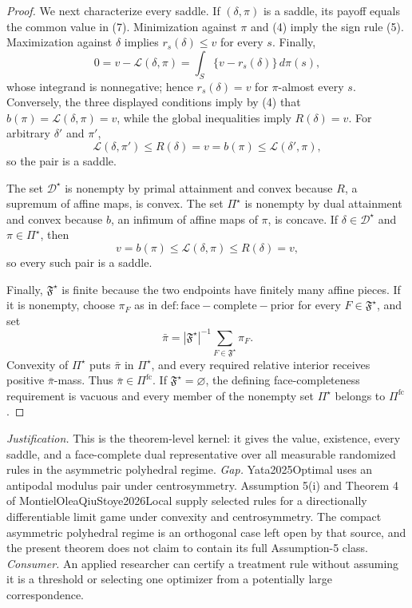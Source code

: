 \documentclass{article}
\begin{document}
\begin{proof}
We next characterize every saddle. If \((\delta,\pi)\) is a saddle, its payoff equals the common value in (7). Minimization against \(\pi\) and (4) imply the sign rule (5). Maximization against \(\delta\) implies \(r_s(\delta)\leq v\) for every \(s\). Finally,
\[
 0=v-\mathcal L(\delta,\pi)=\int_S\{v-r_s(\delta)\}\,d\pi(s),
\]
whose integrand is nonnegative; hence \(r_s(\delta)=v\) for \(\pi\)-almost every \(s\). Conversely, the three displayed conditions imply by (4) that \(b(\pi)=\mathcal L(\delta,\pi)=v\), while the global inequalities imply \(R(\delta)=v\). For arbitrary \(\delta'\) and \(\pi'\),
\[
 \mathcal L(\delta,\pi')\leq R(\delta)=v
 =b(\pi)\leq\mathcal L(\delta',\pi),
\]
so the pair is a saddle.

The set \(\mathcal D^{\star}\) is nonempty by primal attainment and convex because \(R\), a supremum of affine maps, is convex. The set \(\Pi^{\star}\) is nonempty by dual attainment and convex because \(b\), an infimum of affine maps of \(\pi\), is concave. If \(\delta\in\mathcal D^{\star}\) and \(\pi\in\Pi^{\star}\), then
\[
 v=b(\pi)\leq\mathcal L(\delta,\pi)\leq R(\delta)=v,
\]
so every such pair is a saddle.

Finally, \(\mathfrak F^{\star}\) is finite because the two endpoints have finitely many affine pieces. If it is nonempty, choose \(\pi_F\) as in \(\mathrm{def:face-complete-prior}\) for every \(F\in\mathfrak F^{\star}\), and set
\[
 \bar\pi=|\mathfrak F^{\star}|^{-1}\sum_{F\in\mathfrak F^{\star}}\pi_F.
\]
Convexity of \(\Pi^{\star}\) puts \(\bar\pi\) in \(\Pi^{\star}\), and every required relative interior receives positive \(\bar\pi\)-mass. Thus \(\bar\pi\in\Pi^{\mathrm{fc}}\). If \(\mathfrak F^{\star}=\varnothing\), the defining face-completeness requirement is vacuous and every member of the nonempty set \(\Pi^{\star}\) belongs to \(\Pi^{\mathrm{fc}}\).
\end{proof}
\par\smallskip\noindent \textit{Justification.} This is the theorem-level kernel: it gives the value, existence, every saddle, and a face-complete dual representative over all measurable randomized rules in the asymmetric polyhedral regime. \textit{Gap.} Yata2025Optimal uses an antipodal modulus pair under centrosymmetry. Assumption 5(i) and Theorem 4 of MontielOleaQiuStoye2026Local supply selected rules for a directionally differentiable limit game under convexity and centrosymmetry. The compact asymmetric polyhedral regime is an orthogonal case left open by that source, and the present theorem does not claim to contain its full Assumption-5 class. \textit{Consumer.} An applied researcher can certify a treatment rule without assuming it is a threshold or selecting one optimizer from a potentially large correspondence.
\end{document}
